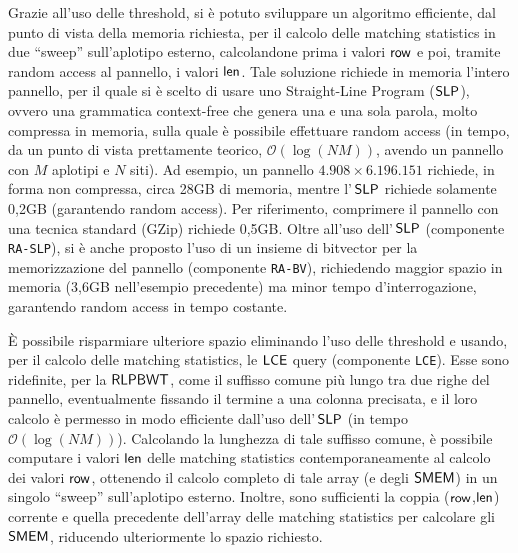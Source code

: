 \documentclass[a4paper,11pt, oneside,italian]{article}
\def\SLP{\mbox{\rm {\sf SLP}}}
\def\LCE{\mbox{\rm {\sf LCE}}}
\def\len{\mbox{\rm {\sf len}}}
\def\row{\mbox{\rm {\sf row}}}
\def\RLPBWT{\mbox{\rm {\sf RLPBWT}}}
\def\SMEM{\mbox{\rm {\sf SMEM}}}
\def\LCE{\mbox{\rm {\sf LCE}}}
\begin{document}
Grazie all'uso delle threshold, si è potuto sviluppare un algoritmo
efficiente, dal punto di vista della memoria richiesta, per il calcolo delle
matching statistics in due ``sweep'' sull'aplotipo esterno, calcolandone prima
i valori $\row$ e poi, tramite random access al pannello, i valori $\len$. Tale
soluzione richiede in memoria l'intero pannello, per il quale 
si è scelto di usare uno Straight-Line Program ($\SLP$), ovvero una grammatica
context-free che genera una e una sola parola, molto compressa in memoria, sulla
quale è possibile effettuare random access (in tempo, da un punto di vista
prettamente teorico, $\mathcal{O}(\log (NM))$, avendo un pannello con $M$
aplotipi e $N$ siti).  
Ad esempio, un pannello $4.908 \times 6.196.151$ richiede, in forma non
compressa, circa 28GB di memoria, mentre l'$\,\SLP$ 
richiede 
solamente 0,2GB (garantendo random access). Per riferimento, comprimere il
pannello con una tecnica 
standard (GZip) richiede 0,5GB. Oltre all'uso dell'$\,\SLP$ (componente
\texttt{RA-SLP}), si è anche proposto l'uso di un insieme di bitvector per la
memorizzazione 
del pannello (componente \texttt{RA-BV}), richiedendo maggior spazio in memoria
(3,6GB nell'esempio precedente) ma minor tempo d'interrogazione, garantendo
random access in tempo 
costante.  

È possibile risparmiare ulteriore spazio eliminando
l'uso delle threshold e usando, per il calcolo delle matching
statistics, le $\LCE$ query (componente \texttt{LCE}). Esse sono
ridefinite, per la $\RLPBWT$, come il suffisso comune più lungo tra due righe
del pannello, eventualmente 
fissando il termine a una colonna precisata, e il loro calcolo è permesso
in modo efficiente dall'uso dell'$\,\SLP$ (in tempo $\mathcal{O}(\log
(NM))$). Calcolando la  
lunghezza di tale suffisso comune, è possibile computare i valori $\len$ delle
matching statistics contemporaneamente al calcolo dei valori $\row$, ottenendo
il calcolo completo di tale array (e degli $\SMEM$) in  
un singolo ``sweep'' sull'aplotipo esterno. Inoltre, sono sufficienti la 
coppia ($\row$,$\len$) corrente e quella precedente dell'array
delle matching statistics per calcolare gli $\SMEM$, riducendo ulteriormente lo
spazio richiesto.
\end{document}

